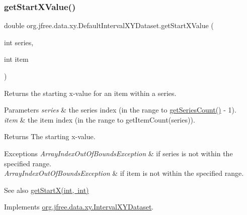 \subsubsection{\texorpdfstring{get\+Start\+X\+Value()}{getStartXValue()}}
{\footnotesize\ttfamily double org.\+jfree.\+data.\+xy.\+Default\+Interval\+X\+Y\+Dataset.\+get\+Start\+X\+Value (\begin{DoxyParamCaption}\item[{int}]{series,  }\item[{int}]{item }\end{DoxyParamCaption})}

Returns the starting x-\/value for an item within a series.


\begin{DoxyParams}{Parameters}
{\em series} & the series index (in the range {} to {\ttfamily \mbox{\hyperlink{classorg_1_1jfree_1_1data_1_1xy_1_1_default_interval_x_y_dataset_a11470bfa9b540c971123d4282c0f5a8a}{get\+Series\+Count()}} -\/ 1}). \\
\hline
{\em item} & the item index (in the range {} to {\ttfamily get\+Item\+Count(series)}).\\
\hline
\end{DoxyParams}
\begin{DoxyReturn}{Returns}
The starting x-\/value.
\end{DoxyReturn}

\begin{DoxyExceptions}{Exceptions}
{\em Array\+Index\+Out\+Of\+Bounds\+Exception} & if {\ttfamily series} is not within the specified range. \\
\hline
{\em Array\+Index\+Out\+Of\+Bounds\+Exception} & if {\ttfamily item} is not within the specified range.\\
\hline
\end{DoxyExceptions}
\begin{DoxySeeAlso}{See also}
\mbox{\hyperlink{classorg_1_1jfree_1_1data_1_1xy_1_1_default_interval_x_y_dataset_af1221379a4ac6d470d0b901b80841940}{get\+Start\+X(int, int)}} 
\end{DoxySeeAlso}


Implements \mbox{\hyperlink{interfaceorg_1_1jfree_1_1data_1_1xy_1_1_interval_x_y_dataset_a437afe7f637a8d16ad305023a7819eef}{org.\+jfree.\+data.\+xy.\+Interval\+X\+Y\+Dataset}}.

\mbox{\label{classorg_1_1jfree_1_1data_1_1xy_1_1_default_interval_x_y_dataset_ad9406f2afbf209d346903c0a004f4aad}} 
